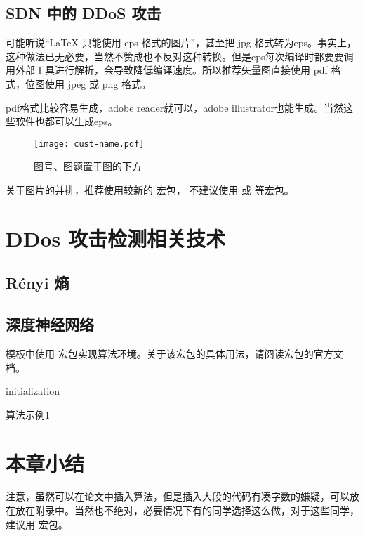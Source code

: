 \subsection{SDN 中的 DDoS 攻击}

可能听说“\LaTeX{} 只能使用 eps 格式的图片”，甚至把 jpg 格式转为eps。事实上，这种做法已无必要，当然不赞成也不反对这种转换。但是eps每次编译时都要要调用外部工具进行解析，会导致降低编译速度。所以推荐矢量图直接使用 pdf 格式，位图使用 jpeg 或 png 格式。

pdf格式比较容易生成，adobe reader就可以，adobe illustrator也能生成。当然这些软件也都可以生成eps。
\begin{figure}[htbp]
  \centering
  \texttt{[image: cust-name.pdf]}
  \caption{图号、图题置于图的下方}
  \label{fig:badge}
\end{figure}

关于图片的并排，推荐使用较新的  宏包，
不建议使用  或  等宏包。



\section{DDos 攻击检测相关技术}
\subsection{Rényi 熵}
\subsection{深度神经网络}

模板中使用  宏包实现算法环境。关于该宏包的具体用法，请阅读宏包的官方文档。
\begin{algorithm}[htbp]
  \SetAlgoLined

  initialization\;
  \caption{算法示例1}
  \label{algo:algorithm1}
\end{algorithm}
\section{本章小结}
注意，虽然可以在论文中插入算法，但是插入大段的代码有凑字数的嫌疑，可以放在放在附录中。当然也不绝对，必要情况下有的同学选择这么做，对于这些同学，建议用  宏包。
